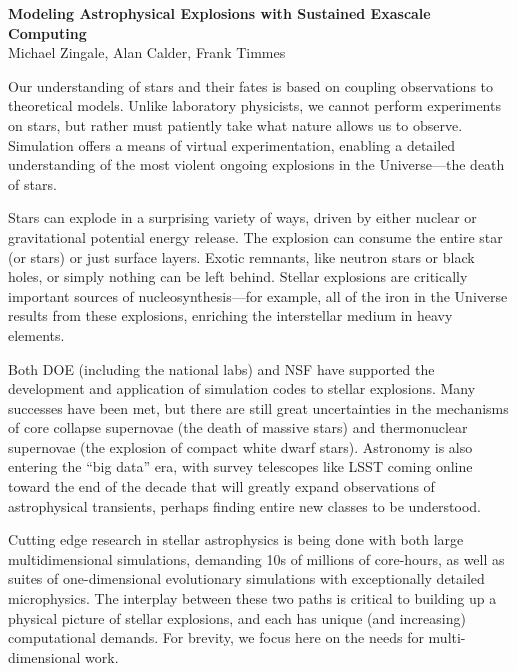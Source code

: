 \documentclass[11pt,twocolumn]{article}
\begin{document}
\begin{center}
{\sffamily \bfseries Modeling Astrophysical Explosions with Sustained Exascale Computing\footnotemark[1]} \\
Michael Zingale\footnotemark[2], Alan Calder\footnotemark[2], Frank Timmes\footnotemark[3]
\end{center}
%

Our understanding of stars and their fates is based on coupling
observations to theoretical models.  Unlike laboratory physicists, we
cannot perform experiments on stars, but rather must
patiently take what nature allows us to observe.  Simulation offers a means
of virtual experimentation, enabling a detailed understanding of the
most violent ongoing explosions in the Universe---the death of stars.

Stars can explode in a surprising variety of ways, driven by either
nuclear or gravitational potential energy release.  The
explosion can consume the entire star (or stars) or just
surface layers.  Exotic remnants, like neutron stars or black holes, or
simply nothing can be left behind.  Stellar explosions are critically
important sources of nucleosynthesis---for example, all of the iron in
the Universe results from these explosions, enriching the interstellar
medium in heavy elements. 

Both DOE (including the national labs) and
NSF have supported the development and application of simulation codes
to stellar explosions.  Many successes have been met, but there are
still great uncertainties in the mechanisms of core collapse
supernovae (the death of massive stars) and thermonuclear supernovae
(the explosion of compact white dwarf stars).  Astronomy is also
entering the ``big data'' era, with survey telescopes like LSST coming
online toward the end of the decade that will greatly expand
observations of astrophysical transients, perhaps finding entire new
classes to be understood.

Cutting edge research in stellar astrophysics is being done with both
large multidimensional simulations, demanding 10s of millions of
core-hours, as well as suites of one-dimensional evolutionary
simulations with exceptionally detailed microphysics.  The interplay
between these two paths is critical to building up a physical picture
of stellar explosions, and each has unique (and increasing)
computational demands.  For brevity, we focus here on the needs for
multi-dimensional work.
\end{document}

